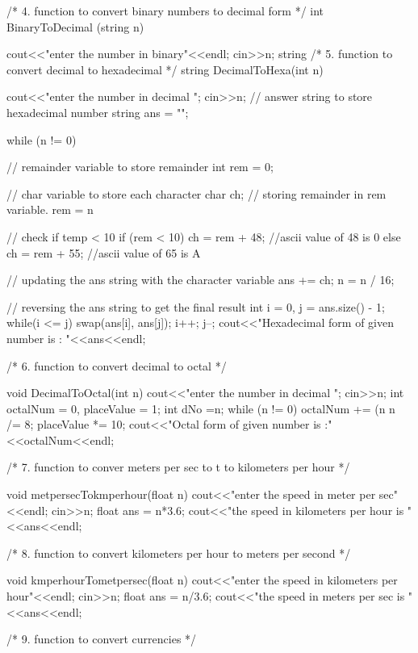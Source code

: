 \documentclass[12pt,a4paper]{article}
\begin{document}
/*
4. function to convert  binary numbers to decimal form
*/
int BinaryToDecimal (string n)
{
cout<<"enter the number in binary"<<endl;
cin>>n;
    string 
 /*
5. function to convert decimal to hexadecimal
*/  
string DecimalToHexa(int n)
{cout<<"enter the number in decimal ";
cin>>n;
    // answer string to store hexadecimal number
    string ans = "";
   
    while (n != 0) {
        // remainder variable to store remainder
        int rem = 0;
         
        // char variable to store each character
        char ch;
        // storing remainder in rem variable.
        rem = n %
 
        // check if temp < 10
        if (rem < 10) {
            ch = rem + 48;    //ascii value of 48 is 0
        }
        else {
            ch = rem + 55;    //ascii value of 65 is A
        }
         
        // updating the ans string with the character variable
        ans += ch;
        n = n / 16;
    }
     
    // reversing the ans string to get the final result
    int i = 0, j = ans.size() - 1;
    while(i <= j)
    {
      swap(ans[i], ans[j]);
      i++;
      j--;
    }
    cout<<"Hexadecimal form of given number is : "<<ans<<endl;
}


 /*
6. function to convert decimal to octal
*/  

void DecimalToOctal(int n) {
    cout<<"enter the number in decimal ";
    cin>>n;
   int octalNum = 0, placeValue = 1;
   int dNo =n;
   while (n != 0) {
      octalNum += (n %
   n /= 8;
      placeValue *= 10;
   }
   cout<<"Octal form of given number is :"<<octalNum<<endl;
}




 /*
7. function to conver meters per sec to t to kilometers per hour
 */  

void metpersecTokmperhour(float n)
{ cout<<"enter the speed in meter per sec"<<endl;
cin>>n;
    float ans = n*3.6;
    cout<<"the speed in kilometers per hour is "<<ans<<endl;
}




/*
8. function to convert kilometers per hour to meters per second
 */  

void kmperhourTometpersec(float n)
{ cout<<"enter the speed in kilometers per hour"<<endl;
cin>>n;
    float ans = n/3.6;
    cout<<"the speed in meters per sec is "<<ans<<endl;
}


/*
9. function to convert currencies
 */ 

}
\end{document}
